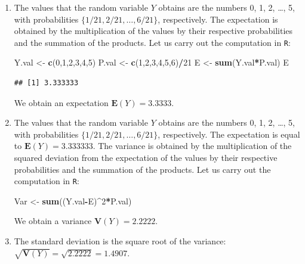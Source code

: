 \documentclass[
]{krantz}
\makeatletter
\newenvironment{Shaded}{\begin{snugshade}}{\end{snugshade}}
\newcommand{\DecValTok}[1]{\textcolor[rgb]{0.00,0.00,0.81}{#1}}
\newcommand{\KeywordTok}[1]{\textcolor[rgb]{0.13,0.29,0.53}{\textbf{#1}}}
\newcommand{\NormalTok}[1]{#1}
\newcommand{\OperatorTok}[1]{\textcolor[rgb]{0.81,0.36,0.00}{\textbf{#1}}}
\newcommand{\StringTok}[1]{\textcolor[rgb]{0.31,0.60,0.02}{#1}}
\newcommand{\Expec}{\mathbf{E}}
\newcommand{\Var}{\mathbf{V}}
\newenvironment{kframe}{%
\medskip{}
\setlength{\fboxsep}{.8em}
 \def\at@end@of@kframe{}%
 \ifinner\ifhmode%
  \def\at@end@of@kframe{\end{minipage}}%
  \begin{minipage}{\columnwidth}%
 \fi\fi%
 \def\FrameCommand##1{\hskip\@totalleftmargin \hskip-\fboxsep
 \colorbox{shadecolor}{##1}\hskip-\fboxsep
     \hskip-\linewidth \hskip-\@totalleftmargin \hskip\columnwidth}%
 \MakeFramed {\advance\hsize-\width
   \@totalleftmargin\z@ \linewidth\hsize
   \@setminipage}}%
 {\par\unskip\endMakeFramed%
 \at@end@of@kframe}
\renewenvironment{Shaded}{\begin{kframe}}{\end{kframe}}
\theoremstyle{definition}
\theoremstyle{definition}
\theoremstyle{definition}
\theoremstyle{remark}
\makeatother
\begin{document}
\begin{enumerate}
\def\labelenumi{\arabic{enumi}.}
\setcounter{enumi}{5}
\item
  The values that the random
  variable \(Y\) obtains are the numbers 0, 1, 2, \ldots{}, 5, with probabilities
  \(\{1/21, 2/21, \ldots, 6/21\}\), respectively. The expectation is
  obtained by the multiplication of the values by their respective
  probabilities and the summation of the products. Let us carry out the
  computation in \texttt{R}:

\begin{Shaded}
\begin{Highlighting}[]
\NormalTok{Y.val <-}\StringTok{ }\KeywordTok{c}\NormalTok{(}\DecValTok{0}\NormalTok{,}\DecValTok{1}\NormalTok{,}\DecValTok{2}\NormalTok{,}\DecValTok{3}\NormalTok{,}\DecValTok{4}\NormalTok{,}\DecValTok{5}\NormalTok{)}
\NormalTok{P.val <-}\StringTok{ }\KeywordTok{c}\NormalTok{(}\DecValTok{1}\NormalTok{,}\DecValTok{2}\NormalTok{,}\DecValTok{3}\NormalTok{,}\DecValTok{4}\NormalTok{,}\DecValTok{5}\NormalTok{,}\DecValTok{6}\NormalTok{)}\OperatorTok{/}\DecValTok{21}
\NormalTok{E <-}\StringTok{ }\KeywordTok{sum}\NormalTok{(Y.val}\OperatorTok{*}\NormalTok{P.val)}
\NormalTok{E}
\end{Highlighting}
\end{Shaded}

\begin{verbatim}
## [1] 3.333333
\end{verbatim}

  We obtain an expectation \(\Expec(Y) = 3.3333\).
\item
  The values that the random
  variable \(Y\) obtains are the numbers 0, 1, 2, \ldots{}, 5, with probabilities
  \(\{1/21, 2/21, \ldots, 6/21\}\), respectively. The expectation is equal
  to \(\Expec(Y) = 3.333333\). The variance is obtained by the
  multiplication of the squared deviation from the expectation of the
  values by their respective probabilities and the summation of the
  products. Let us carry out the computation in \texttt{R}:

\begin{Shaded}
\begin{Highlighting}[]
\NormalTok{Var <-}\StringTok{ }\KeywordTok{sum}\NormalTok{((Y.val}\OperatorTok{-}\NormalTok{E)}\OperatorTok{^}\DecValTok{2}\OperatorTok{*}\NormalTok{P.val)}
\end{Highlighting}
\end{Shaded}

  We obtain a variance \(\Var(Y) = 2.2222\).
\item
  The standard deviation is the
  square root of the variance: \(\sqrt{\Var(Y)} = \sqrt{2.2222} = 1.4907\).
\end{enumerate}
\end{document}
